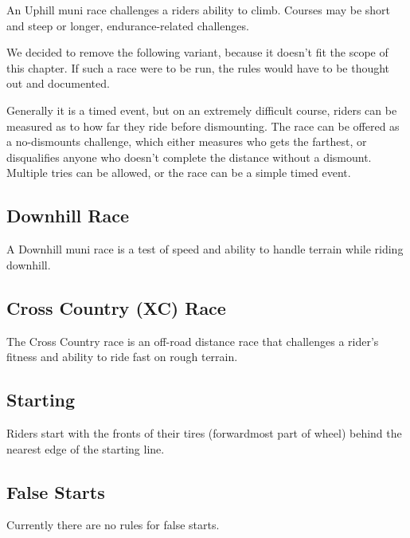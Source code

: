 An Uphill muni race challenges a riders ability to climb.
Courses may be short and steep or longer, endurance-related challenges. 

\begin{comment-2016}
We decided to remove the following variant, because it doesn't fit the
scope of this chapter.  If such a race were to be run,
the rules would have to be thought out and documented.

Generally it is a timed event, but on an extremely difficult course, riders can be measured as to how far they ride before dismounting.
The race can be offered as a no-dismounts challenge, which either measures who gets the farthest, or disqualifies anyone who doesn't complete the distance without a dismount.
Multiple tries can be allowed, or the race can be a simple timed event.
\end{comment-2016}

\subsection{Downhill Race \label{sec:muni_downhill}}

A Downhill muni race is a test of speed and ability to handle terrain while riding downhill.

\subsection{Cross Country (XC) Race\label{sec:muni_xc}}

The Cross Country race is an off-road distance race that challenges a rider's fitness and ability to ride fast on rough terrain.

\subsection{Starting}

Riders start with the fronts of their tires (forwardmost part of wheel) behind the nearest edge of the starting line.

\begin{comment-2016}
\subsection{False Starts}

Currently there are no rules for false starts.
\end{comment-2016}

